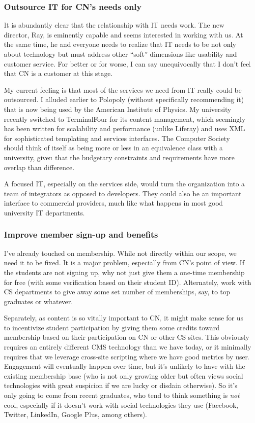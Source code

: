 \documentclass[11pt,english]{luclet}
\begin{document}
\subsubsection{Outsource IT for CN's needs only}

It is abundantly clear that the relationship with IT needs work. The new
director, Ray, is eminently capable and seems interested in working with
us. At the same time, he and everyone needs to realize that IT needs to
be not only about technology but must address other ``soft'' dimensions
like usability and customer service. For better or for worse, I can say
unequivocally that I don't feel that CN is a customer at this stage.

My current feeling is that most of the services we need from IT really
could be outsourced. I alluded earlier to Polopoly (without specifically
recommending it) that is now being used by the American Institute of
Physics. My university recently switched to TerminalFour for its content
management, which seemingly has been written for scalability and
performance (unlike Liferay) and uses XML for sophisticated templating
and services interfaces. The Computer Society should think of itself as
being more or less in an equivalence class with a university, given that
the budgetary constraints and requirements have more overlap than
difference.

A focused IT, especially on the services side, would turn the
organization into a team of integrators as opposed to developers. They
could also be an important interface to commercial providers, much like
what happens in most good university IT departments.

\subsubsection{Improve member sign-up and benefits}

I've already touched on membership. While not directly within our scope,
we need it to be fixed. It is a major problem, especially from CN's
point of view. If the students are not signing up, why not just give
them a one-time membership for free (with some verification based on
their student ID). Alternately, work with CS departments to give away
some set number of memberships, say, to top graduates or whatever.

Separately, as content is so vitally important to CN, it might make
sense for us to incentivize student participation by giving them some
credits toward membership based on their participation on CN or other CS
sites. This obviously requires an entirely different CMS technology than
we have today, or it minimally requires that we leverage cross-site
scripting where we have good metrics by user. Engagement will eventually
happen over time, but it's unlikely to have with the existing membership
base (who is not only growing older but often views social technologies
with great suspicion if we are lucky or disdain otherwise). So it's only
going to come from recent graduates, who tend to think something is
\emph{not} cool, especially if it doesn't work with social technologies
they use (Facebook, Twitter, LinkedIn, Google Plus, among others).
\end{document}
